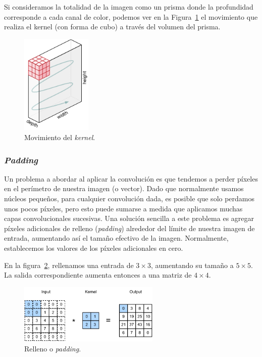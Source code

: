 \documentclass[a4paper,12pt]{article}
\begin{document}
Si consideramos la totalidad de la imagen como un prisma donde la profundidad corresponde a cada canal de color, podemos ver en la Figura~\ref{fig:kernelmove} el movimiento que realiza el kernel (con forma de cubo) a través del volumen del prisma.

\begin{figure}[H]
	\begin{center}				
	\includegraphics[width=0.3\textwidth]{kernelmove.png}
  	\caption{Movimiento del \textit{kernel}.}
  	\label{fig:kernelmove}
  	\end{center}
\end{figure}

\subsubsection{\textit{Padding}}

Un problema a abordar al aplicar la convolución es que tendemos a perder píxeles en el perímetro de nuestra imagen (o vector). Dado que normalmente usamos núcleos pequeños, para cualquier convolución dada, es posible que solo perdamos unos pocos píxeles, pero esto puede sumarse a medida que aplicamos muchas capas convolucionales sucesivas. Una solución sencilla a este problema es agregar píxeles adicionales de relleno (\textit{padding}) alrededor del límite de nuestra imagen de entrada, aumentando así el tamaño efectivo de la imagen. Normalmente, establecemos los valores de los píxeles adicionales en cero. \citep{padding}

En la figura~\ref{fig:padding}, rellenamos una entrada de $3 \times 3$, aumentando su tamaño a $5 \times 5$. La salida correspondiente aumenta entonces a una matriz de $4 \times 4$.

\begin{figure}[H]
	\begin{center}				
	\includegraphics[width=0.6\textwidth]{conv-pad.png}
  	\caption{Relleno o \textit{padding}.}
  	\label{fig:padding}
  	\end{center}
\end{figure}
\end{document}
